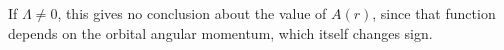 If $\Lambda\ne0$, this gives no conclusion about the value of $A(r)$, since that function depends on the orbital angular momentum, which itself changes sign.
